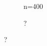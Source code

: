 \documentclass[12pt,a4paper]{article}
\begin{document}
\begin{figure}[h]
\centering
\caption{\footnotesize [TODO].}	
	\begin{subfigure}{.5\textwidth}
	  \centering
	  \caption{n=400}  %
	\end{subfigure}%
	\begin{subfigure}{.5\textwidth}
	  \centering
	  \caption{?} %
	\end{subfigure}
\end{figure}
\end{document}
